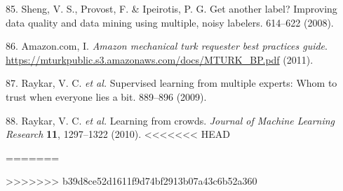 \documentclass[]{article}
\begin{document}
\begin{cslreferences}
\leavevmode\hypertarget{ref-Sheng2008}{}%
85. Sheng, V. S., Provost, F. \& Ipeirotis, P. G. Get another label? Improving data quality and data mining using multiple, noisy labelers. 614--622 (2008).

\leavevmode\hypertarget{ref-MTurk2011}{}%
86. Amazon.com, I. \emph{Amazon mechanical turk requester best practices guide}. \url{https://mturkpublic.s3.amazonaws.com/docs/MTURK_BP.pdf} (2011).

\leavevmode\hypertarget{ref-Raykar2009}{}%
87. Raykar, V. C. \emph{et al.} Supervised learning from multiple experts: Whom to trust when everyone lies a bit. 889--896 (2009).

\leavevmode\hypertarget{ref-Raykar2010}{}%
88. Raykar, V. C. \emph{et al.} Learning from crowds. \emph{Journal of Machine Learning Research} \textbf{11}, 1297--1322 (2010).
<<<<<<< HEAD

=======
\end{cslreferences}
>>>>>>> b39d8ce52d1611f9d74bf2913b07a43c6b52a360
\end{document}
